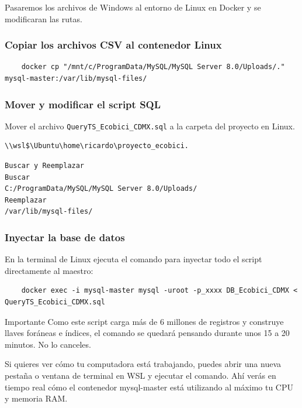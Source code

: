 \documentclass[10pt,a4paper]{article}
\begin{document}
Pasaremos los archivos de Windows al entorno de Linux en Docker y se modificaran las rutas.

\subsubsection{Copiar los archivos CSV al contenedor Linux}

\begin{lstlisting}
    docker cp "/mnt/c/ProgramData/MySQL/MySQL Server 8.0/Uploads/." mysql-master:/var/lib/mysql-files/
\end{lstlisting}

\subsubsection{Mover y modificar el script SQL}

Mover el archivo \texttt{QueryTS\_Ecobici\_CDMX.sql} a la carpeta del proyecto en Linux.

\begin{lstlisting}
\\wsl$\Ubuntu\home\ricardo\proyecto_ecobici.
\end{lstlisting}

\begin{lstlisting}
Buscar y Reemplazar
Buscar
C:/ProgramData/MySQL/MySQL Server 8.0/Uploads/
Reemplazar
/var/lib/mysql-files/
\end{lstlisting}

\subsubsection{Inyectar la base de datos}

En la terminal de Linux ejecuta el comando para inyectar todo el script directamente al maestro:

\begin{lstlisting}
    docker exec -i mysql-master mysql -uroot -p_xxxx DB_Ecobici_CDMX < QueryTS_Ecobici_CDMX.sql
\end{lstlisting}

\begin{alerta}{Importante}
Como este script carga más de 6 millones de registros y construye llaves foráneas e índices, el comando se quedará pensando durante unos 15 a 20 minutos. No lo canceles.
\end{alerta}

Si quieres ver cómo tu computadora está trabajando, puedes abrir una nueva pestaña o ventana de terminal en WSL y ejecutar el comando. Ahí verás en tiempo real cómo el contenedor mysql-master está utilizando al máximo tu CPU y memoria RAM.
\end{document}
